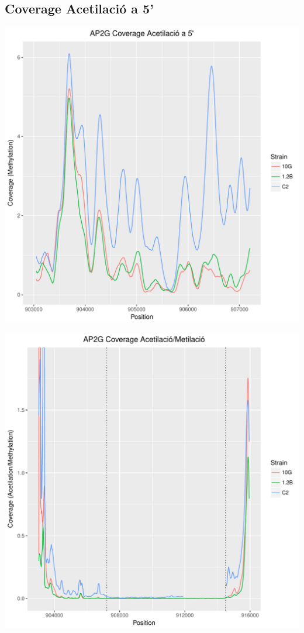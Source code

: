 \documentclass{article}\usepackage[]{graphicx}\usepackage[]{color}
\newenvironment{knitrout}{}{} %
\begin{document}
\subsection{Coverage Acetilació a 5'}
\begin{knitrout}
\color{fgcolor}
\includegraphics[width=1\linewidth]{figure/plot_ac_5-1} 

\end{knitrout}
\clearpage
\begin{knitrout}
\color{fgcolor}
\includegraphics[width=1\linewidth]{figure/Ac_Met-1} 

\end{knitrout}
\end{document}
